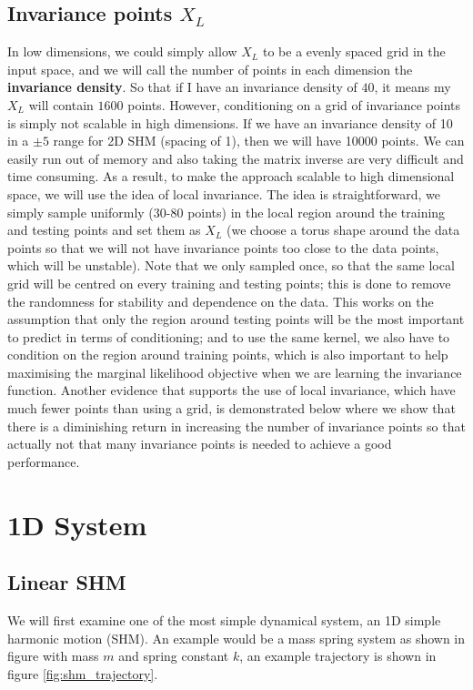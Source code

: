 \documentclass{statsmsc}
\begin{document}
\subsection*{Invariance points $X_L$}
In low dimensions, we could simply allow $X_L$ to be a evenly spaced grid in the input space, and we will call the number of points in each dimension the \textbf{invariance density}.
So that if I have an invariance density of $40$, it means my $X_L$ will contain $1600$ points. 
However, conditioning on a grid of invariance points is simply not scalable in high dimensions. 
If we have an invariance density of 10 in a $\pm 5$ range for 2D SHM (spacing of 1), then we will have 10000 points. 
We can easily run out of memory and also taking the matrix inverse are very difficult and time consuming.
As a result, to make the approach scalable to high dimensional space, we will use the idea of local invariance. 
The idea is straightforward, we simply sample uniformly (30-80 points) in the local region around the training and testing points and set them as $X_L$ (we choose a torus shape around the data points so that we will not have invariance points too close to the data points, which will be unstable).
Note that we only sampled once, so that the same local grid will be centred on every training and testing points; this is done to remove the randomness for stability and dependence on the data.
This works on the assumption that only the region around testing points will be the most important to predict in terms of conditioning; and to use the same kernel, we also have to condition on the region around training points, which is also important to help maximising the marginal likelihood objective when we are learning the invariance function.
Another evidence that supports the use of local invariance, which have much fewer points than using a grid, is demonstrated below where we show that there is a diminishing return in increasing the number of invariance points so that actually not that many invariance points is needed to achieve a good performance. 

\section{1D System}
\subsection{Linear SHM}
We will first examine one of the most simple dynamical system, an 1D simple harmonic motion (SHM). 
An example would be a mass spring system as shown in figure with mass $m$ and spring constant $k$, an example trajectory is shown in figure \ref{fig:shm_trajectory}. 
\end{document}
